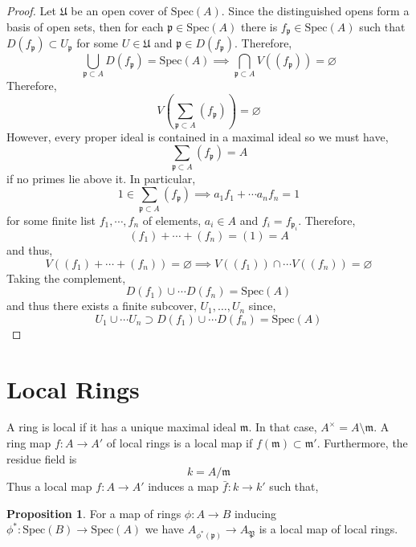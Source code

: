 \documentclass[12pt]{article}
\newcommand{\spec}[1]{\mathrm{Spec}\left( #1 \right)}
\newcommand{\Spec}[1]{\mathrm{Spec}\left( #1 \right)}
\newcommand{\p}{\mathfrak{p}}
\newcommand{\m}{\mathfrak{m}}
\theoremstyle{remark}
\theoremstyle{definition}
\newtheorem{proposition}[theorem]{Proposition}
\newenvironment{definition}[1][Definition:]{\begin{trivlist}
\item[\hskip \labelsep {\bfseries #1}]}{\end{trivlist}}
\begin{document}
\begin{proof}
Let $\mathfrak{U}$ be an open cover of $\Spec{A}$. Since the distinguished opens form a basis of open sets, then for each $\p \in \Spec{A}$ there is $f_\p \in \Spec{A}$ such that $D(f_\p) \subset U_\p$ for some $U \in \mathfrak{U}$ and $\p \in D(f_\p)$. Therefore,
\[ \bigcup_{\p \subset A} D(f_\p) = \Spec{A} \implies \bigcap_{\p \subset A} V((f_\p)) = \varnothing \]
Therefore,
\[ V \left( \sum_{\p \subset A} (f_\p) \right) = \varnothing \]
However, every proper ideal is contained in a maximal ideal so we must have,
\[ \sum_{\p \subset A} (f_\p) = A \]
if no primes lie above it. In particular, 
\[ 1 \in  \sum_{\p \subset A} (f_\p) \implies a_1 f_1 + \cdots a_n f_n = 1 \]
for some finite list $f_1, \cdots, f_n$ of elements, $a_i \in A$ and $f_i = f_{\p_i}$. Therefore, 
\[ (f_1) + \cdots + (f_n) = (1) = A \] 
and thus,
\[ V( (f_1) + \cdots + (f_n) ) = \varnothing \implies V((f_1)) \cap \cdots V((f_n)) = \varnothing \]
Taking the complement,
\[ D(f_1) \cup \cdots D(f_n) = \Spec{A} \]
and thus there exists a finite subcover, $U_1, \dots, U_n$ since,
\[ U_1 \cup \cdots U_n \supset D(f_1) \cup \cdots D(f_n) = \Spec{A} \]

\end{proof}

\section{Local Rings}


\begin{definition}
A ring is local if it has a unique maximal ideal $\m$. In that case, $A^\times = A \setminus \m$. A ring map $f : A \to A'$ of local rings is a local map if $f(\m) \subset \m'$. Furthermore, the residue field is 
\[ k = A / \m \]  
Thus a local map $f : A \to A'$ induces a map $\bar{f} : k \to k'$ such that,
\begin{center}
\end{center}
\end{definition}

\begin{proposition}
For a map of rings $\phi : A \to B$ inducing $\phi^* : \spec{B} \to \spec{A}$ we have $A_{\phi^*(\mathfrak{p})} \to A_{\mathfrak{P}}$ is a local map of local rings.
\end{proposition}
\end{document}
